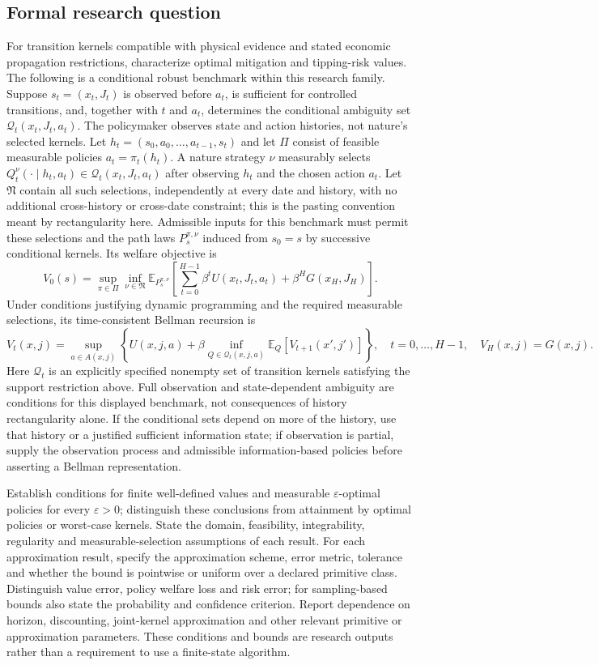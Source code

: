 \documentclass[11pt,a4paper]{article}
\begin{document}
\subsection*{Formal research question}

For transition kernels compatible with physical evidence and stated economic propagation restrictions, characterize optimal mitigation and tipping-risk values. The following is a conditional robust benchmark within this research family. Suppose $s_t=(x_t,J_t)$ is observed before $a_t$, is sufficient for controlled transitions, and, together with $t$ and $a_t$, determines the conditional ambiguity set $\mathcal Q_t(x_t,J_t,a_t)$. The policymaker observes state and action histories, not nature's selected kernels. Let $h_t=(s_0,a_0,\ldots,a_{t-1},s_t)$ and let $\Pi$ consist of feasible measurable policies $a_t=\pi_t(h_t)$. A nature strategy $\nu$ measurably selects $Q_t^\nu(\cdot\mid h_t,a_t)\in\mathcal Q_t(x_t,J_t,a_t)$ after observing $h_t$ and the chosen action $a_t$. Let $\mathfrak N$ contain all such selections, independently at every date and history, with no additional cross-history or cross-date constraint; this is the pasting convention meant by rectangularity here. Admissible inputs for this benchmark must permit these selections and the path laws $P_s^{\pi,\nu}$ induced from $s_0=s$ by successive conditional kernels. Its welfare objective is
\[
V_0(s)=\sup_{\pi\in\Pi}\inf_{\nu\in\mathfrak N}
\mathbb E_{P_s^{\pi,\nu}}\!\left[
\sum_{t=0}^{H-1}\beta^t U(x_t,J_t,a_t)+\beta^H G(x_H,J_H)
\right].
\]
Under conditions justifying dynamic programming and the required measurable selections, its time-consistent Bellman recursion is
\[
V_t(x,j)=\sup_{a\in A(x,j)}
\left\{U(x,j,a)+\beta\inf_{Q\in\mathcal Q_t(x,j,a)}
\mathbb E_Q[V_{t+1}(x',j')]\right\},\quad t=0,\ldots,H-1,\quad V_H(x,j)=G(x,j).
\]
Here $\mathcal Q_t$ is an explicitly specified nonempty set of transition kernels satisfying the support restriction above. Full observation and state-dependent ambiguity are conditions for this displayed benchmark, not consequences of history rectangularity alone. If the conditional sets depend on more of the history, use that history or a justified sufficient information state; if observation is partial, supply the observation process and admissible information-based policies before asserting a Bellman representation.

Establish conditions for finite well-defined values and measurable $\varepsilon$-optimal policies for every $\varepsilon>0$; distinguish these conclusions from attainment by optimal policies or worst-case kernels. State the domain, feasibility, integrability, regularity and measurable-selection assumptions of each result. For each approximation result, specify the approximation scheme, error metric, tolerance and whether the bound is pointwise or uniform over a declared primitive class. Distinguish value error, policy welfare loss and risk error; for sampling-based bounds also state the probability and confidence criterion. Report dependence on horizon, discounting, joint-kernel approximation and other relevant primitive or approximation parameters. These conditions and bounds are research outputs rather than a requirement to use a finite-state algorithm.
\end{document}
